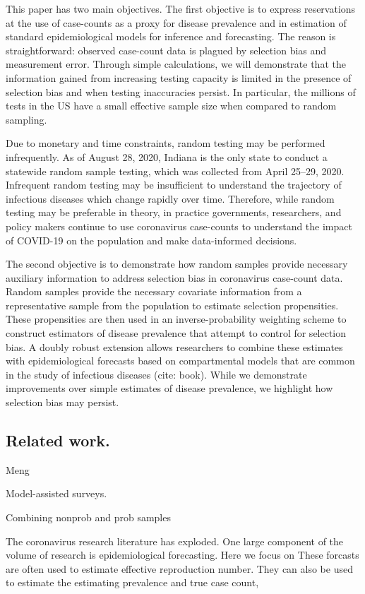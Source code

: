 \documentclass[11pt]{amsart}
\begin{document}
This paper has two main objectives.  The first objective is to express reservations at the use of case-counts as a proxy for disease prevalence and in estimation of standard epidemiological models for inference and forecasting.  The reason is straightforward: observed case-count data is plagued by selection bias and measurement error. Through simple calculations, we will demonstrate that the information gained from increasing testing capacity is limited in the presence of selection bias and when testing inaccuracies persist.  In particular, the millions of tests in the US have a small effective sample size when compared to random sampling.

Due to monetary and time constraints, random testing may be performed infrequently.  As of August 28, 2020, Indiana is the only state to conduct a statewide random sample testing, which was collected from April 25--29, 2020.  Infrequent random testing may be insufficient to understand the trajectory of infectious diseases which change rapidly over time.  Therefore, while random testing may be preferable in theory, in practice governments, researchers, and policy makers continue to use coronavirus case-counts to understand the impact of COVID-19 on the population and make data-informed decisions.

The second objective is to demonstrate how random samples provide necessary auxiliary information to address selection bias in coronavirus case-count data.  Random samples provide the necessary covariate information from a representative sample from the population to estimate selection propensities. These propensities are then used in an inverse-probability weighting scheme to construct estimators of disease prevalence that attempt to control for selection bias.  A doubly robust extension allows researchers to combine these estimates with epidemiological forecasts based on compartmental models that are common in the study of infectious diseases (cite: book).  While we demonstrate improvements over simple estimates of disease prevalence, we highlight how selection bias may persist.

\subsection{Related work.}

Meng

Model-assisted surveys.

Combining nonprob and prob samples

The coronavirus research literature has exploded. One large component of the volume of research is epidemiological forecasting.  Here we focus on
These forcasts are often used to estimate effective reproduction number.  They can also be used to estimate the   estimating prevalence and true case count,
\end{document}
